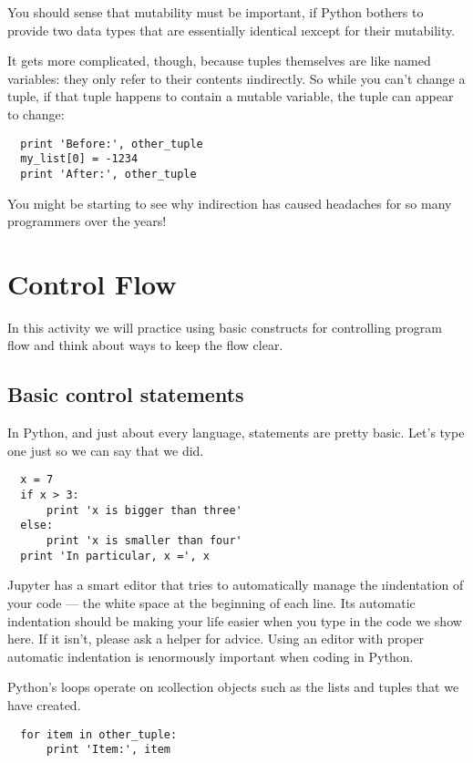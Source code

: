 \documentclass[letterpaper, 12pt, titlepage, twoside]{article}
\begin{document}
You should sense that mutability must be important, if Python bothers to
provide two data types that are essentially identical \i{except} for their
mutability.

It gets more complicated, though, because tuples themselves are like named
variables: they only refer to their contents \i{indirectly}. So while you
can't change a tuple, if that tuple happens to contain a mutable variable, the
tuple can appear to change:

\begin{lstlisting}
  print 'Before:', other_tuple
  my_list[0] = -1234
  print 'After:', other_tuple
\end{lstlisting}

You might be starting to see why indirection has caused headaches for so many
programmers over the years!


\newpage
\section{Control Flow}

In this activity we will practice using basic constructs for controlling
program flow and think about ways to keep the flow clear.

\subsection*{Basic control statements}

In Python, and just about every language,  statements are pretty basic.
Let's type one just so we can say that we did.

\begin{lstlisting}
  x = 7
  if x > 3:
      print 'x is bigger than three'
  else:
      print 'x is smaller than four'
  print 'In particular, x =', x
\end{lstlisting}

Jupyter has a smart editor that tries to automatically manage the
\i{indentation} of your code --- the white space at the beginning of each
line. Its automatic indentation should be making your life easier when you
type in the code we show here. If it isn't, please ask a helper for advice.
Using an editor with proper automatic indentation is \i{enormously} important
when coding in Python.

Python's  loops operate on \i{collection} objects such as the lists and
tuples that we have created.

\begin{lstlisting}
  for item in other_tuple:
      print 'Item:', item
\end{lstlisting}
\end{document}
